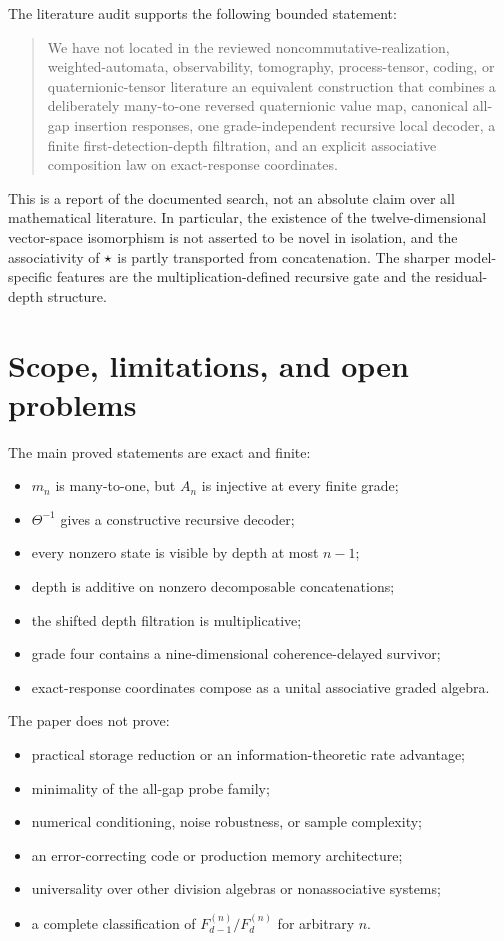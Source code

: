 The literature audit supports the following bounded statement:

\begin{quote}
We have not located in the reviewed noncommutative-realization, weighted-automata, observability, tomography, process-tensor, coding, or quaternionic-tensor literature an equivalent construction that combines a deliberately many-to-one reversed quaternionic value map, canonical all-gap insertion responses, one grade-independent recursive local decoder, a finite first-detection-depth filtration, and an explicit associative composition law on exact-response coordinates.
\end{quote}

This is a report of the documented search, not an absolute claim over all mathematical literature.  In particular, the existence of the twelve-dimensional vector-space isomorphism is not asserted to be novel in isolation, and the associativity of $\star$ is partly transported from concatenation.  The sharper model-specific features are the multiplication-defined recursive gate and the residual-depth structure.

\section{Scope, limitations, and open problems}\label{sec:limitations}

The main proved statements are exact and finite:
\begin{itemize}
  \item $m_n$ is many-to-one, but $A_n$ is injective at every finite grade;
  \item $\Theta^{-1}$ gives a constructive recursive decoder;
  \item every nonzero state is visible by depth at most $n-1$;
  \item depth is additive on nonzero decomposable concatenations;
  \item the shifted depth filtration is multiplicative;
  \item grade four contains a nine-dimensional coherence-delayed survivor;
  \item exact-response coordinates compose as a unital associative graded algebra.
\end{itemize}

The paper does not prove:
\begin{itemize}
  \item practical storage reduction or an information-theoretic rate advantage;
  \item minimality of the all-gap probe family;
  \item numerical conditioning, noise robustness, or sample complexity;
  \item an error-correcting code or production memory architecture;
  \item universality over other division algebras or nonassociative systems;
  \item a complete classification of $F_{d-1}^{(n)}/F_d^{(n)}$ for arbitrary $n$.
\end{itemize}

